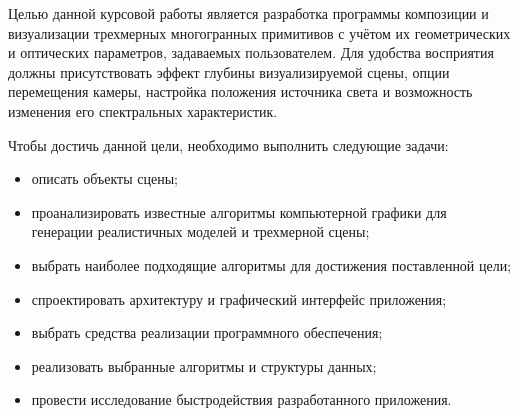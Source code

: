 
Целью данной курсовой работы является разработка программы композиции и визуализации трехмерных многогранных примитивов с учётом их геометрических и оптических параметров, задаваемых пользователем. Для удобства восприятия должны присутствовать эффект глубины визуализируемой сцены, опции перемещения камеры, настройка положения источника света и возможность изменения его спектральных характеристик.

Чтобы достичь данной цели, необходимо выполнить следующие задачи:
\begin{itemize}[label=--]
	\item описать объекты сцены;
	\item проанализировать известные алгоритмы компьютерной графики для генерации реалистичных моделей и трехмерной сцены;
	\item выбрать наиболее подходящие алгоритмы для достижения поставленной цели;
	\item спроектировать архитектуру и графический интерфейс приложения;
	\item выбрать средства реализации программного обеспечения;
	\item реализовать выбранные алгоритмы и структуры данных;
	\item провести исследование быстродействия разработанного приложения.
\end{itemize}

\clearpage
